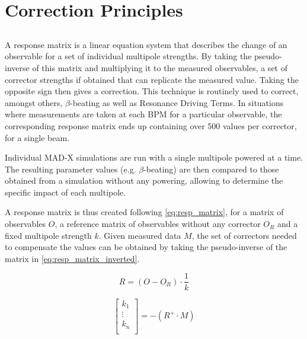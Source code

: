 \section{Correction Principles}


\subsection{}

A response matrix is a linear equation system that describes the change of an observable for a set
of individual multipole strengths. By taking the pseudo-inverse of this matrix and multiplying it to
the measured observables, a set of corrector strengths if obtained that can replicate the measured
value. Taking the opposite sign then gives a correction.  This technique is routinely used to
correct, amongst others, $\beta$-beating as well as Resonance Driving Terms. In situations where
measurements are taken at each BPM for a particular observable, the corresponding response matrix
ends up containing over 500 values per corrector, for a single beam.

Individual MAD-X simulations are run with a single multipole powered at a time. The resulting
parameter values (e.g. $\beta$-beating) are then compared to those obtained from a simulation without
any powering, allowing to determine the specific impact of each multipole.

A response matrix is thus created following \cref{eq:resp_matrix}, for a matrix of observables
$O$, a reference matrix of observables without any corrector $O_R$ and a fixed multipole strength
$k$. Given measured data $M$, the set of correctors needed to compensate the values can be obtained
by taking the pseudo-inverse of the matrix in \cref{eq:resp_matrix_inverted}.

\begin{equation}
  R = \left(O - O_R \right) \cdot \frac{1}{k}
  \label{eq:resp_matrix}
\end{equation}

\begin{equation}
  \begin{bmatrix}
    k_1 \\
    \vdots \\
    k_n \\
  \end{bmatrix}
  = -(R^{+} \cdot M)
  \label{eq:resp_matrix_inverted}
\end{equation}
 
